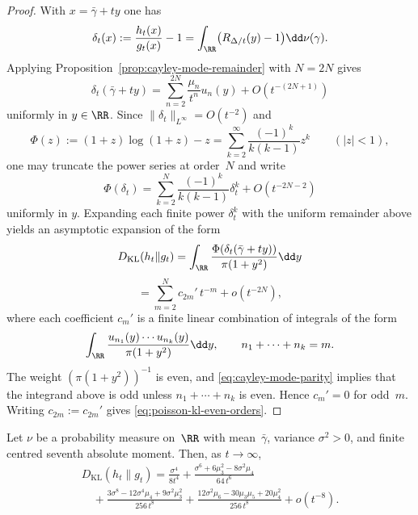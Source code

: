 \begin{proof}
With $x=\bar\gamma+ty$ one has
\[
\delta_t(x):=\frac{h_t(x)}{g_t(x)}-1
=\int_{\RR}\bigl(R_{\Delta/t}(y)-1\bigr)\dd\nu(\gamma).
\]
Applying Proposition~\ref{prop:cayley-mode-remainder} with $N=2N$ gives
\[
\delta_t(\bar\gamma+ty)
=\sum_{n=2}^{2N}\frac{\mu_n}{t^n}u_n(y)+O(t^{-(2N+1)})
\]
uniformly in $y\in\RR$.  Since $\|\delta_t\|_{L^\infty}=O(t^{-2})$ and
\[
\Phi(z):=(1+z)\log(1+z)-z
=\sum_{k=2}^{\infty}\frac{(-1)^k}{k(k-1)}z^k
\qquad(|z|<1),
\]
one may truncate the power series at order~$N$ and write
\[
\Phi(\delta_t)
=\sum_{k=2}^{N}\frac{(-1)^k}{k(k-1)}\delta_t^k+O(t^{-2N-2})
\]
uniformly in $y$.  Expanding each finite power $\delta_t^k$ with the
uniform remainder above yields an asymptotic expansion of the form
\[
D_{\mathrm{KL}}(h_t\|g_t)
=\int_{\RR}\frac{\Phi(\delta_t(\bar\gamma+ty))}{\pi(1+y^2)}\dd y
\]
\[
=\sum_{m=2}^{N} c_{2m}'\,t^{-m}+o(t^{-2N}),
\]
where each coefficient $c_m'$ is a finite linear combination of integrals
of the form
\[
\int_{\RR}\frac{u_{n_1}(y)\cdots u_{n_k}(y)}{\pi(1+y^2)}\dd y,
\qquad
n_1+\cdots+n_k=m.
\]
The weight $(\pi(1+y^2))^{-1}$ is even, and
\eqref{eq:cayley-mode-parity} implies that the integrand above is odd
unless $n_1+\cdots+n_k$ is even.  Hence $c_m'=0$ for odd~$m$.  Writing
$c_{2m}:=c_{2m}'$ gives \eqref{eq:poisson-kl-even-orders}.
\end{proof}

\begin{theorem}%
\label{thm:poisson-kl-eighth}
Let $\nu$ be a probability measure on~$\RR$ with mean~$\bar\gamma$,
variance $\sigma^2>0$, and finite centred seventh absolute moment.  Then,
as $t\to\infty$,
\begin{equation}\label{eq:poisson-kl-eighth}
\begin{split}
D_{\mathrm{KL}}(h_t\|g_t)
=\frac{\sigma^4}{8t^4}
+\frac{\sigma^6+6\mu_3^2-8\sigma^2\mu_4}{64\,t^6}
\\
\quad
+\frac{3\sigma^8-12\sigma^4\mu_4+9\sigma^2\mu_3^2}{256\,t^8}
+\frac{12\sigma^2\mu_6-30\mu_3\mu_5+20\mu_4^2}{256\,t^8}
+o(t^{-8}).
\end{split}
\end{equation}
\end{theorem}

